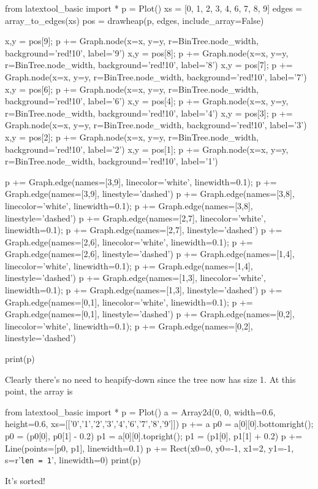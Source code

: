 \begin{python}
from latextool_basic import *
p = Plot()
xs = [0, 1, 2, 3, 4, 6, 7, 8, 9]
edges = array_to_edges(xs)
pos = drawheap(p, edges, include_array=False)

x,y = pos[9]; p += Graph.node(x=x, y=y, r=BinTree.node_width, background='red!10', label='9')
x,y = pos[8]; p += Graph.node(x=x, y=y, r=BinTree.node_width, background='red!10', label='8')
x,y = pos[7]; p += Graph.node(x=x, y=y, r=BinTree.node_width, background='red!10', label='7')
x,y = pos[6]; p += Graph.node(x=x, y=y, r=BinTree.node_width, background='red!10', label='6')
x,y = pos[4]; p += Graph.node(x=x, y=y, r=BinTree.node_width, background='red!10', label='4')
x,y = pos[3]; p += Graph.node(x=x, y=y, r=BinTree.node_width, background='red!10', label='3')
x,y = pos[2]; p += Graph.node(x=x, y=y, r=BinTree.node_width, background='red!10', label='2')
x,y = pos[1]; p += Graph.node(x=x, y=y, r=BinTree.node_width, background='red!10', label='1')

p += Graph.edge(names=[3,9], linecolor='white', linewidth=0.1); p += Graph.edge(names=[3,9], linestyle='dashed')
p += Graph.edge(names=[3,8], linecolor='white', linewidth=0.1); p += Graph.edge(names=[3,8], linestyle='dashed')
p += Graph.edge(names=[2,7], linecolor='white', linewidth=0.1); p += Graph.edge(names=[2,7], linestyle='dashed')
p += Graph.edge(names=[2,6], linecolor='white', linewidth=0.1); p += Graph.edge(names=[2,6], linestyle='dashed')
p += Graph.edge(names=[1,4], linecolor='white', linewidth=0.1); p += Graph.edge(names=[1,4], linestyle='dashed')
p += Graph.edge(names=[1,3], linecolor='white', linewidth=0.1); p += Graph.edge(names=[1,3], linestyle='dashed')
p += Graph.edge(names=[0,1], linecolor='white', linewidth=0.1); p += Graph.edge(names=[0,1], linestyle='dashed')
p += Graph.edge(names=[0,2], linecolor='white', linewidth=0.1); p += Graph.edge(names=[0,2], linestyle='dashed')

print(p)
\end{python}

Clearly there's no need to heapify-down since the tree now has size 1.
At this point, the array is
\begin{python}
from latextool_basic import *
p = Plot()
a = Array2d(0, 0, width=0.6, height=0.6, 
             xs=[['0','1','2','3','4','6','7','8','9']])
p += a
p0 = a[0][0].bottomright(); p0 = (p0[0], p0[1] - 0.2)
p1 = a[0][0].topright(); p1 = (p1[0], p1[1] + 0.2)
p += Line(points=[p0, p1], linewidth=0.1)
p += Rect(x0=0, y0=-1, x1=2, y1=-1, s=r'\texttt{len = 1}', linewidth=0) 
print(p)
\end{python}
It's sorted!

